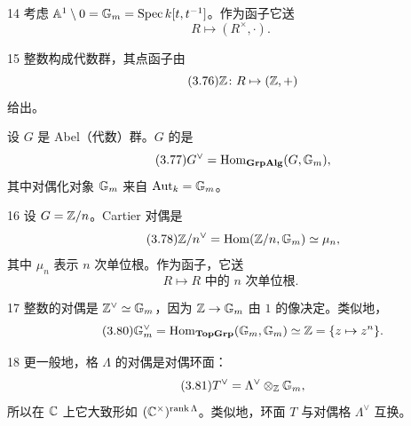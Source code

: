 \begin{srcex}{14}
考虑 $\mathbb{A}^1\setminus 0=\mathbb{G}_m=\mathrm{Spec}\,k[t,t^{-1}]$。作为函子它送
\begin{equation}\tag{3.75}
R\mapsto (R^{\times},\cdot).
\end{equation}
\end{srcex}

\begin{srcex}{15}
整数构成代数群，其点函子由
\begin{equation}\tag{3.76}
\mathbb{Z}\colon R\mapsto(\mathbb{Z},+)
\end{equation}
给出。
\end{srcex}

设 $G$ 是 Abel（代数）群。$G$ 的是
\begin{equation}\tag{3.77}
G^{\vee}=\mathrm{Hom}_{\mathbf{GrpAlg}}(G,\mathbb{G}_m),
\end{equation}
其中对偶化对象 $\mathbb{G}_m$ 来自 $\mathrm{Aut}_k=\mathbb{G}_m$。

\begin{srcex}{16}
设 $G=\mathbb{Z}/n$。Cartier 对偶是
\begin{equation}\tag{3.78}
\mathbb{Z}/n^{\vee}=\mathrm{Hom}(\mathbb{Z}/n,\mathbb{G}_m)\simeq\mu_n,
\end{equation}
其中 $\mu_n$ 表示 $n$ 次单位根。作为函子，它送
\begin{equation}\tag{3.79}
R\mapsto \text{$R$ 中的 $n$ 次单位根}.
\end{equation}
\end{srcex}

\begin{srcex}{17}
整数的对偶是 $\mathbb{Z}^{\vee}\simeq\mathbb{G}_m$，因为 $\mathbb{Z}\to\mathbb{G}_m$ 由 $1$ 的像决定。类似地，
\begin{equation}\tag{3.80}
\mathbb{G}_m^{\vee}=\mathrm{Hom}_{\mathbf{TopGrp}}(\mathbb{G}_m,\mathbb{G}_m)\simeq\mathbb{Z}=\{z\mapsto z^{n}\}.
\end{equation}
\end{srcex}

\begin{srcex}{18}
更一般地，格 $\Lambda$ 的对偶是对偶环面：
\begin{equation}\tag{3.81}
T^{\vee}=\Lambda^{\vee}\otimes_{\mathbb{Z}}\mathbb{G}_m,
\end{equation}
所以在 $\mathbb{C}$ 上它大致形如 $(\mathbb{C}^{\times})^{\operatorname{rank}\Lambda}$。类似地，环面 $T$ 与对偶格 $\Lambda^{\vee}$ 互换。
\end{srcex}

